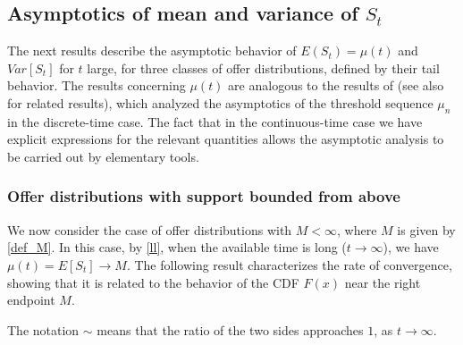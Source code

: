 \documentclass{article}
\numberwithin{equation}{section}
\begin{document}
\subsection{Asymptotics of mean and variance of $S_t$}
\label{asymptotics1}

The next results describe
the asymptotic behavior of $E(S_t)=\mu(t)$ and $Var[S_t]$ for $t$ large, for three classes of offer distributions, defined 
by their tail behavior.
The results concerning $\mu(t)$ are 
analogous to the results of \cite{Kennedy} (see also \cite{Livanos} for related results), which analyzed the 
asymptotics of the threshold sequence 
$\mu_n$ in the discrete-time case.
The fact that in the continuous-time case we have explicit expressions for the relevant quantities allows 
the asymptotic analysis to be carried out by elementary tools.


\subsubsection{Offer distributions with  support bounded from above}

We now consider the case of offer distributions with $M<\infty$, where $M$ is given by \eqref{def_M}.
In this case, by \eqref{ll}, when
the available time is long ($t\rightarrow\infty$), we have $\mu(t)=E[S_t]\rightarrow M$. The following result characterizes the rate of convergence, showing that it is related to the behavior of the CDF $F(x)$ near the right
endpoint $M$.

The notation $\sim$ means that the ratio of the two sides approaches $1$, as $t\rightarrow \infty$. 
\end{document}
